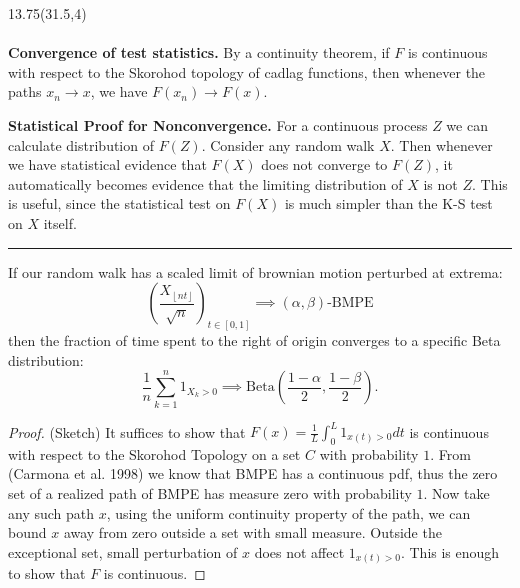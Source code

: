 \documentclass[a0]{a0poster}
\begin{document}
\begin{textblock}{13.75}(31.5,4)
\medskip
{}\\  %
\\ 
\textbf{Convergence of test statistics.} 
By a continuity theorem, if $F$ is continuous with respect to the Skorohod topology of cadlag functions, then whenever the paths $x_n \to x$, we have $F(x_n) \to F(x)$.

\textbf{Statistical Proof for Nonconvergence.} For a continuous process $Z$ we can calculate distribution of $F(Z)$. Consider any random walk $X$. Then whenever we have statistical evidence that $F(X)$ does not converge to $F(Z)$, it automatically becomes evidence that the limiting distribution of $X$ is not $Z$. This is useful, since the statistical test on $F(X)$ is much simpler than the K-S test on $X$ itself.

\hspace{1in}
\hrule
\hspace{1in}

\begin{theorem}
If our random walk has a scaled limit of brownian motion perturbed at extrema:$$\left(\frac{X_{\left\lfloor nt  \right\rfloor}}{\sqrt{n} }\right)_{t \in [0,1]} \implies (\alpha, \beta)\text{-BMPE}$$then the fraction of time spent to the right of origin converges to a specific Beta distribution:$$\frac{1}{n} \sum_{k=1}^{n} 1_{X_k > 0} \implies \text{Beta}\left( \frac{1-\alpha}{2}, \frac{1-\beta}{2} \right).$$
\end{theorem}

\hspace{1in}

\begin{proof} (Sketch)
It suffices to show that $F(x) = \frac{1}{L} \int_0^L 1_{x(t) > 0} dt$ is continuous with respect to the Skorohod Topology on a set $C$ with probability $1$. From (Carmona et al. 1998) we know that BMPE has a continuous pdf, thus the zero set of a realized path of BMPE has measure zero with probability $1$. Now take any such path $x$, using the uniform continuity property of the path, we can bound $x$ away from zero outside a set with small measure. Outside the exceptional set, small perturbation of $x$ does not affect $1_{x(t) > 0}$. This is enough to show that $F$ is continuous.
\end{proof}

\end{textblock}
\end{document}
